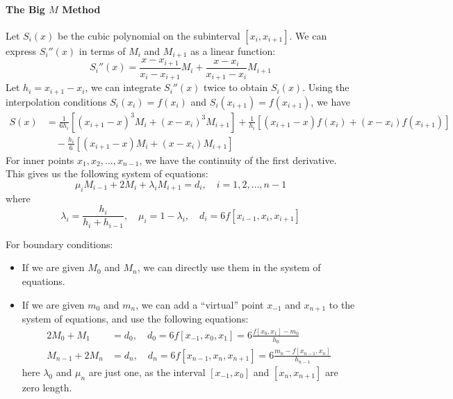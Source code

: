 \documentclass{matharticle}
\begin{document}
\paragraph{The Big $M$ Method}
Let $S_i(x)$ be the cubic polynomial on the subinterval $[x_i, x_{i+1}]$. We can express $S_i''(x)$ in terms of $M_i$ and $M_{i+1}$ as a linear function:
\begin{equation}
	S_i''(x) = \frac{x - x_{i+1}}{x_i - x_{i+1}} M_i + \frac{x - x_i}{x_{i+1} - x_i} M_{i+1}
\end{equation}
Let $h_i = x_{i+1} - x_i$, we can integrate $S_i''(x)$ twice to obtain $S_i(x)$. Using the interpolation conditions $S_i(x_i) = f(x_i)$ and $S_i(x_{i+1}) = f(x_{i+1})$, we have
\begin{equation}
	\begin{aligned}
		S(x) & = \frac{1}{6 h_i} \left[ (x_{i+1} - x)^3 M_i + (x - x_i)^3 M_{i+1} \right] + \frac{1}{h_i} \left[ (x_{i+1} - x) f(x_i) + (x - x_i) f(x_{i+1}) \right] \\
		     & \quad - \frac{h_i}{6} \left[ (x_{i+1} - x) M_i + (x - x_i) M_{i+1} \right]
	\end{aligned}
\end{equation}
For inner points $x_1, x_2, \ldots, x_{n-1}$, we have the continuity of the first derivative. This gives us the following system of equations:
\begin{equation}
	\mu_i M_{i-1} + 2 M_i + \lambda_i M_{i+1} = d_i, \quad i = 1, 2, \ldots, n-1
\end{equation}
where
\begin{equation}
	\lambda_i = \frac{h_i}{h_i + h_{i-1}}, \quad \mu_i = 1 - \lambda_i, \quad d_i = 6 f[x_{i-1}, x_i, x_{i+1}]
\end{equation}

For boundary conditions:
\begin{itemize}
	\item If we are given $M_0$ and $M_n$, we can directly use them in the system of equations.
	\item If we are given $m_0$ and $m_n$, we can add a ``virtual'' point $x_{-1}$ and $x_{n+1}$ to the system of equations, and use the following equations:
	      \begin{equation}
		      \begin{aligned}
			      2 M_0 + M_1     & = d_0, \quad d_0 = 6 f[x_{-1}, x_0, x_1] = 6 \frac{f[x_0, x_1] - m_0}{h_0}              \\
			      M_{n-1} + 2 M_n & = d_n, \quad d_n = 6 f[x_{n-1}, x_n, x_{n+1}] = 6 \frac{m_n - f[x_{n-1}, x_n]}{h_{n-1}}
		      \end{aligned}
	      \end{equation}
	      here $\lambda_0$ and $\mu_n$ are just one, as the interval $[x_{-1}, x_0]$ and $[x_n, x_{n+1}]$ are zero length.
\end{itemize}
\end{document}
